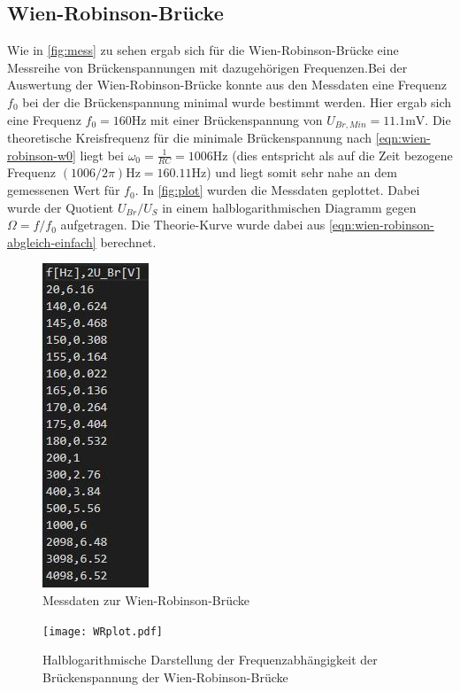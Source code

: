 \subsection{Wien-Robinson-Brücke}
Wie in \autoref{fig:mess} zu sehen ergab sich für die Wien-Robinson-Brücke eine Messreihe von Brückenspannungen mit dazugehörigen Frequenzen.Bei der Auswertung der Wien-Robinson-Brücke konnte aus den Messdaten eine Frequenz $f_0$ bei der die Brückenspannung minimal wurde bestimmt werden. Hier ergab sich eine Frequenz $f_0=160 \si{\hertz}$ mit einer Brückenspannung von $U_{Br,Min}=11.1 \si{\milli} \si{\volt}$. Die theoretische Kreisfrequenz für die minimale Brückenspannung nach \autoref{eqn:wien-robinson-w0} liegt bei $\omega_0=\frac{1}{RC}=1006\si{\hertz}$ (dies entspricht als auf die Zeit bezogene Frequenz $(1006/2\pi)\si{\hertz}=160.11\si{\hertz}$) und liegt somit sehr nahe an dem gemessenen Wert für $f_0$. In \autoref{fig:plot} wurden die Messdaten geplottet. Dabei wurde der Quotient $U_{Br}/U_S$ in einem halblogarithmischen Diagramm gegen $\Omega=f/f_0$ aufgetragen. Die Theorie-Kurve wurde dabei aus \autoref{eqn:wien-robinson-abgleich-einfach} berechnet.
\begin{figure}
  \centering
  \includegraphics{daten/WienR.JPG}
  \caption{Messdaten zur Wien-Robinson-Brücke}
  \label{fig:mess}
\end{figure}


\begin{figure}
  \centering
  \texttt{[image: WRplot.pdf]}
  \caption{Halblogarithmische Darstellung der Frequenzabhängigkeit der Brückenspannung der Wien-Robinson-Brücke}
  \label{fig:plot}
\end{figure}
\newpage

